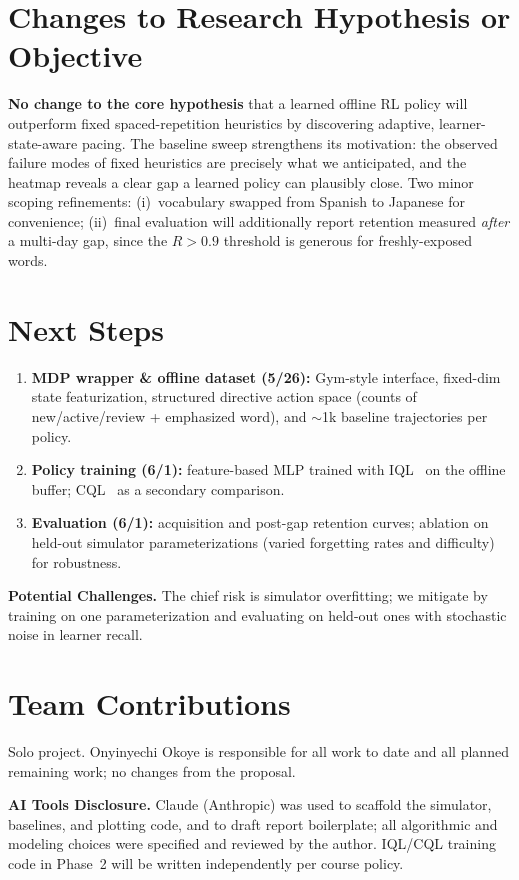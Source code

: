 \documentclass{article}
\begin{document}
\section{Changes to Research Hypothesis or Objective}
\textbf{No change to the core hypothesis} that a learned offline RL policy will outperform fixed spaced-repetition heuristics by discovering adaptive, learner-state-aware pacing. The baseline sweep strengthens its motivation: the observed failure modes of fixed heuristics are precisely what we anticipated, and the heatmap reveals a clear gap a learned policy can plausibly close. Two minor scoping refinements: (i)~vocabulary swapped from Spanish to Japanese for convenience; (ii)~final evaluation will additionally report retention measured \emph{after} a multi-day gap, since the $R\!>\!0.9$ threshold is generous for freshly-exposed words.

\section{Next Steps}
\begin{enumerate}[leftmargin=*]
    \item \textbf{MDP wrapper \& offline dataset (5/26):} Gym-style interface, fixed-dim state featurization, structured directive action space (counts of new/active/review + emphasized word), and $\sim$1k baseline trajectories per policy.
    \item \textbf{Policy training (6/1):} feature-based MLP trained with IQL~\cite{iql} on the offline buffer; CQL~\cite{cql} as a secondary comparison.
    \item \textbf{Evaluation (6/1):} acquisition and post-gap retention curves; ablation on held-out simulator parameterizations (varied forgetting rates and difficulty) for robustness.
\end{enumerate}

\textbf{Potential Challenges.} The chief risk is simulator overfitting; we mitigate by training on one parameterization and evaluating on held-out ones with stochastic noise in learner recall.

\section{Team Contributions}
Solo project. Onyinyechi Okoye is responsible for all work to date and all planned remaining work; no changes from the proposal.

\textbf{AI Tools Disclosure.} Claude (Anthropic) was used to scaffold the simulator, baselines, and plotting code, and to draft report boilerplate; all algorithmic and modeling choices were specified and reviewed by the author. IQL/CQL training code in Phase~2 will be written independently per course policy.



\end{document}
